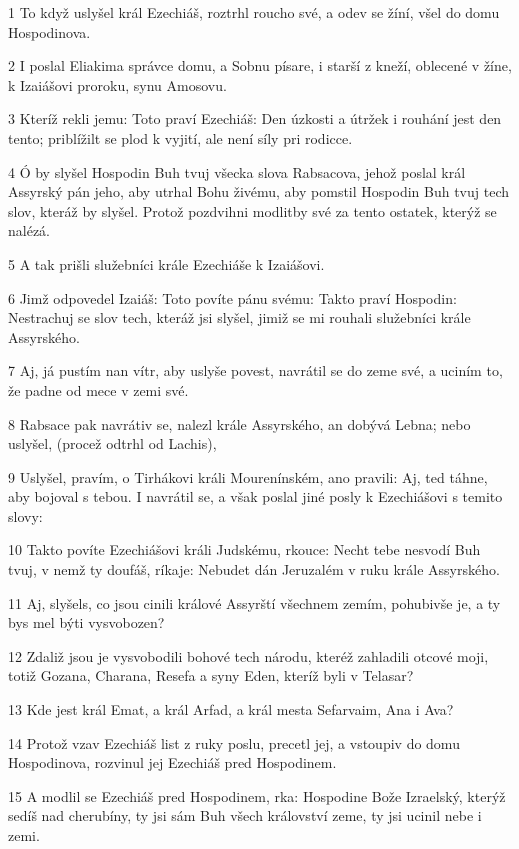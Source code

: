 \par 1 To když uslyšel král Ezechiáš, roztrhl roucho své, a odev se žíní, všel do domu Hospodinova.
\par 2 I poslal Eliakima správce domu, a Sobnu písare, i starší z kneží, oblecené v žíne, k Izaiášovi proroku, synu Amosovu.
\par 3 Kteríž rekli jemu: Toto praví Ezechiáš: Den úzkosti a útržek i rouhání jest den tento; priblížilt se plod k vyjití, ale není síly pri rodicce.
\par 4 Ó by slyšel Hospodin Buh tvuj všecka slova Rabsacova, jehož poslal král Assyrský pán jeho, aby utrhal Bohu živému, aby pomstil Hospodin Buh tvuj tech slov, kteráž by slyšel. Protož pozdvihni modlitby své za tento ostatek, kterýž se nalézá.
\par 5 A tak prišli služebníci krále Ezechiáše k Izaiášovi.
\par 6 Jimž odpovedel Izaiáš: Toto povíte pánu svému: Takto praví Hospodin: Nestrachuj se slov tech, kteráž jsi slyšel, jimiž se mi rouhali služebníci krále Assyrského.
\par 7 Aj, já pustím nan vítr, aby uslyše povest, navrátil se do zeme své, a uciním to, že padne od mece v zemi své.
\par 8 Rabsace pak navrátiv se, nalezl krále Assyrského, an dobývá Lebna; nebo uslyšel, (procež odtrhl od Lachis),
\par 9 Uslyšel, pravím, o Tirhákovi králi Mourenínském, ano pravili: Aj, ted táhne, aby bojoval s tebou. I navrátil se, a však poslal jiné posly k Ezechiášovi s temito slovy:
\par 10 Takto povíte Ezechiášovi králi Judskému, rkouce: Necht tebe nesvodí Buh tvuj, v nemž ty doufáš, ríkaje: Nebudet dán Jeruzalém v ruku krále Assyrského.
\par 11 Aj, slyšels, co jsou cinili králové Assyrští všechnem zemím, pohubivše je, a ty bys mel býti vysvobozen?
\par 12 Zdaliž jsou je vysvobodili bohové tech národu, kteréž zahladili otcové moji, totiž Gozana, Charana, Resefa a syny Eden, kteríž byli v Telasar?
\par 13 Kde jest král Emat, a král Arfad, a král mesta Sefarvaim, Ana i Ava?
\par 14 Protož vzav Ezechiáš list z ruky poslu, precetl jej, a vstoupiv do domu Hospodinova, rozvinul jej Ezechiáš pred Hospodinem.
\par 15 A modlil se Ezechiáš pred Hospodinem, rka: Hospodine Bože Izraelský, kterýž sedíš nad cherubíny, ty jsi sám Buh všech království zeme, ty jsi ucinil nebe i zemi.
